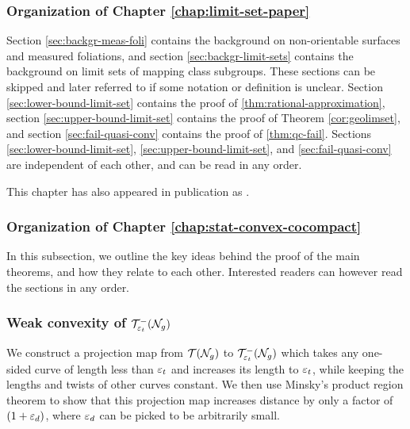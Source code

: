 \subsubsection*{Organization of Chapter \ref{chap:limit-set-paper}}

Section \ref{sec:backgr-meas-foli} contains the background on non-orientable surfaces and measured foliations, and section \ref{sec:backgr-limit-sets} contains the background on limit sets of mapping class subgroups.
These sections can be skipped and later referred to if some notation or definition is unclear.
Section \ref{sec:lower-bound-limit-set} contains the proof of \autoref{thm:rational-approximation}, section \ref{sec:upper-bound-limit-set} contains the proof of Theorem \ref{cor:geolimset}, and section \ref{sec:fail-quasi-conv} contains the proof of \autoref{thm:qc-fail}.
Sections \ref{sec:lower-bound-limit-set}, \ref{sec:upper-bound-limit-set}, and \ref{sec:fail-quasi-conv} are independent of each other, and can be read in any order.

This chapter has also appeared in publication as \cite{limitsetkhan}.

\subsubsection*{Organization of Chapter \ref{chap:stat-convex-cocompact}}

In this subsection, we outline the key ideas behind the proof of the main theorems, and how they relate to each other.
Interested readers can however read the sections in any order.

\subsubsection*{Weak convexity of $\mathcal{T}_{\varepsilon_t}^{-}(\mathcal{N}_g)$}
We construct a projection map from $\mathcal{T}(\mathcal{N}_g)$ to $\mathcal{T}_{\varepsilon_t}^{-}(\mathcal{N}_g)$ which takes any one-sided curve of length less than $\varepsilon_t$ and increases its length to $\varepsilon_t$, while keeping the lengths and twists of other curves constant.
We then use Minsky's product region theorem to show that this projection map increases distance by only a factor of $(1 + \varepsilon_d)$, where $\varepsilon_d$ can be picked to be arbitrarily small.

